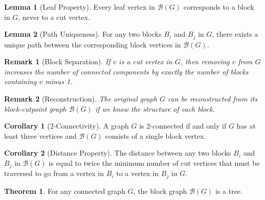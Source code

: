 \documentclass{article}
\newtheorem{remark}{Remark}
\theoremstyle{definition}
\newtheorem{theorem}{Theorem}
\newtheorem{lemma}{Lemma}
\newtheorem{corollary}{Corollary}
\begin{document}
\begin{lemma}[Leaf Property]
Every leaf vertex in $\mathcal{B}(G)$ corresponds to a block in $G$, never to a cut vertex.
\end{lemma}

\begin{lemma}[Path Uniqueness]
For any two blocks $B_i$ and $B_j$ in $G$, there exists a unique path between the corresponding block vertices in $\mathcal{B}(G)$.
\end{lemma}

\begin{remark}[Block Separation]
If $v$ is a cut vertex in $G$, then removing $v$ from $G$ increases the number of connected components by exactly the number of blocks containing $v$ minus 1.
\end{remark}

\begin{remark}[Reconstruction]
The original graph $G$ can be reconstructed from its block-cutpoint graph $\mathcal{B}(G)$ if we know the structure of each block.
\end{remark}

\begin{corollary}[2-Connectivity]
A graph $G$ is 2-connected if and only if $G$ has at least three vertices and $\mathcal{B}(G)$ consists of a single block vertex.
\end{corollary}

\begin{corollary}[Distance Property]
The distance between any two blocks $B_i$ and $B_j$ in $\mathcal{B}(G)$ is equal to twice the minimum number of cut vertices that must be traversed to go from a vertex in $B_i$ to a vertex in $B_j$ in $G$.
\end{corollary}

\begin{theorem}
For any connected graph $G$, the block graph $\mathcal{B}(G)$ is a tree.
\end{theorem}
\end{document}
